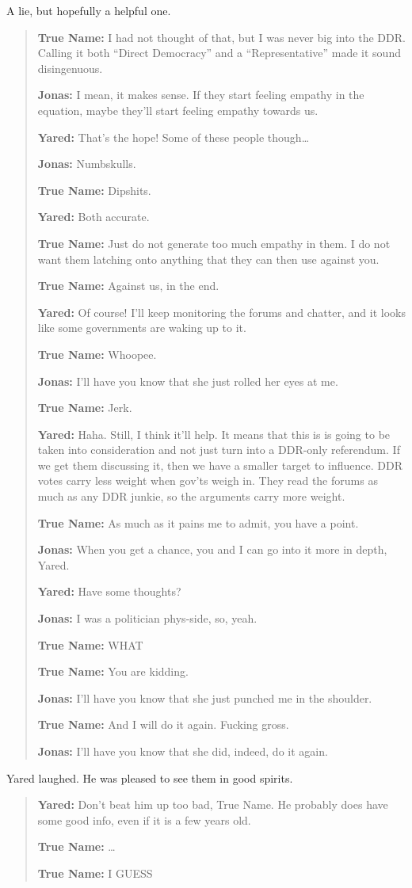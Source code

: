 A lie, but hopefully a helpful one.

\begin{quote}
\textbf{True Name:} I had not thought of that, but I was never big into the DDR. Calling it both ``Direct Democracy'' and a ``Representative'' made it sound disingenuous.

\textbf{Jonas:} I mean, it makes sense. If they start feeling empathy in the equation, maybe they'll start feeling empathy towards us.

\textbf{Yared:} That's the hope! Some of these people though\ldots{}

\textbf{Jonas:} Numbskulls.

\textbf{True Name:} Dipshits.

\textbf{Yared:} Both accurate.

\textbf{True Name:} Just do not generate too much empathy in them. I do not want them latching onto anything that they can then use against you.

\textbf{True Name:} Against us, in the end.

\textbf{Yared:} Of course! I'll keep monitoring the forums and chatter, and it looks like some governments are waking up to it.

\textbf{True Name:} Whoopee.

\textbf{Jonas:} I'll have you know that she just rolled her eyes at me.

\textbf{True Name:} Jerk.

\textbf{Yared:} Haha. Still, I think it'll help. It means that this is is going to be taken into consideration and not just turn into a DDR-only referendum. If we get them discussing it, then we have a smaller target to influence. DDR votes carry less weight when gov'ts weigh in. They read the forums as much as any DDR junkie, so the arguments carry more weight.

\textbf{True Name:} As much as it pains me to admit, you have a point.

\textbf{Jonas:} When you get a chance, you and I can go into it more in depth, Yared.

\textbf{Yared:} Have some thoughts?

\textbf{Jonas:} I was a politician phys-side, so, yeah.

\textbf{True Name:} WHAT

\textbf{True Name:} You are kidding.

\textbf{Jonas:} I'll have you know that she just punched me in the shoulder.

\textbf{True Name:} And I will do it again. Fucking gross.

\textbf{Jonas:} I'll have you know that she did, indeed, do it again.
\end{quote}

Yared laughed. He was pleased to see them in good spirits.

\begin{quote}
\textbf{Yared:} Don't beat him up too bad, True Name. He probably does have some good info, even if it is a few years old.

\textbf{True Name:} \ldots{}

\textbf{True Name:} I GUESS
\end{quote}
